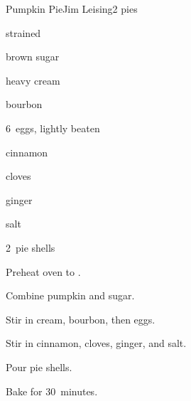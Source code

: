 \begin{recipe}{Pumpkin Pie}{Jim Leising}{2 pies}

\begin{ingredients}
\item \C{1\threequarter} strained 
\item {} brown sugar
\item \C{1\half} heavy cream
\item \C{\half} bourbon
\item 6~eggs, lightly beaten
\item {} cinnamon
\item \tp{\half} cloves
\item \tp{1\half} ginger
\item \tp{\quarter} salt
\item 2~pie shells
\end{ingredients}

\begin{directions}
\item Preheat oven to .
\item Combine pumpkin and sugar.
\item Stir in cream, bourbon, then eggs.
\item Stir in cinnamon, cloves, ginger, and salt.
\item Pour pie shells.
\item Bake for 30~minutes.
\end{directions}

\end{recipe}

